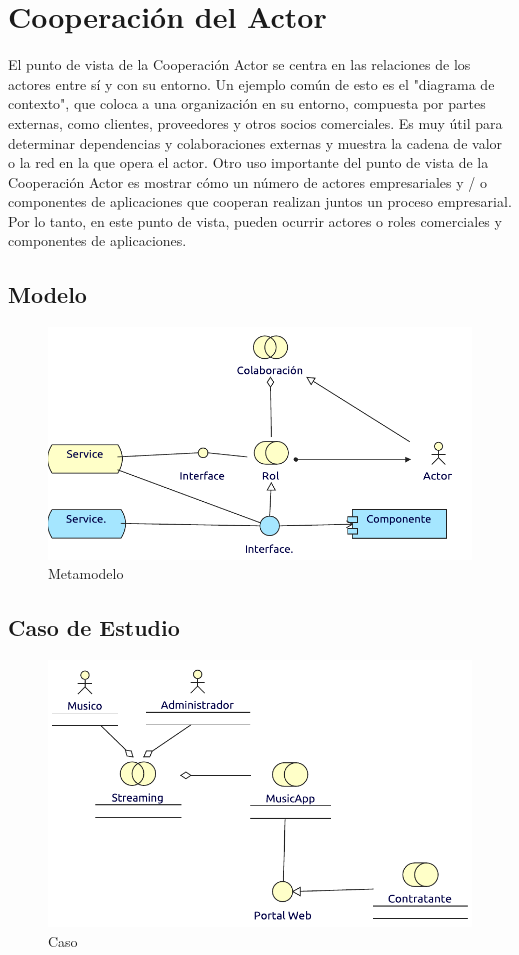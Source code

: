\section{Cooperación del Actor}
El punto de vista de la Cooperación Actor se centra en las relaciones de los actores entre sí y con su entorno. Un ejemplo común de esto es el "diagrama de contexto", que coloca a una organización en su entorno, compuesta por partes externas, como clientes, proveedores y otros socios comerciales. Es muy útil para determinar dependencias y colaboraciones externas y muestra la cadena de valor o la red en la que opera el actor. Otro uso importante del punto de vista de la Cooperación Actor es mostrar cómo un número de actores empresariales y / o componentes de aplicaciones que cooperan realizan juntos un proceso empresarial. Por lo tanto, en este punto de vista, pueden ocurrir actores o roles comerciales y componentes de aplicaciones.
\subsection{Modelo}
\begin{figure}[h!]
	\centering
	\includegraphics[width=\linewidth]{Arquitectura/Negocio/imgs/cooperacionActorMetaModelo.pdf}
	\caption{Metamodelo}
\end{figure}
\newpage
\subsection{Caso de Estudio}

\begin{figure}[h!]
	\centering
	\includegraphics[width=\linewidth]{Arquitectura/Negocio/imgs/cooperacionActor.pdf}
	\caption{Caso}
\end{figure}
\newpage



